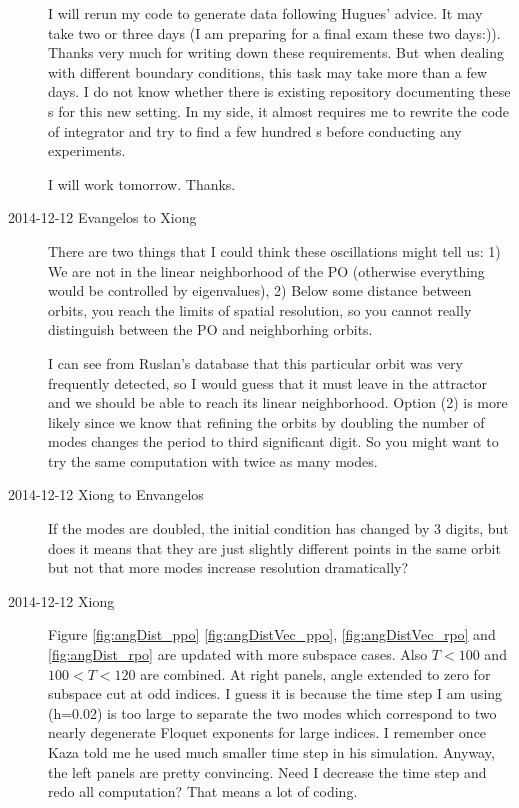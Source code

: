 \begin{description}
I will rerun my code to generate data following Hugues' advice.
It may take two or three days (I am preparing for a final exam these
two days:)). Thanks very much for writing down these requirements.
But when dealing with different boundary conditions,
this task may take more than a few days.
I do not know whether there is existing repository
documenting these \po s for this new setting.
In my side, it almost requires me to rewrite
the code of integrator and try to find a few hundred \po s
before conducting any experiments.

I will work tomorrow. Thanks.

\item[2014-12-12 Evangelos to Xiong] There are two things that I could think
these oscillations might tell us: 1) We are not in the linear
neighborhood of the PO (otherwise everything would be controlled by
{\stabmat} eigenvalues), 2) Below some distance between orbits, you reach
the limits of spatial resolution, so you cannot really distinguish
between the PO and neighborhing orbits.

I can see from Ruslan's database that this particular orbit was very
frequently detected, so I would guess that it must leave in the attractor
and we should be able to reach its linear neighborhood. Option (2) is more
likely since we know that refining the orbits by doubling the number of
modes changes the period to third significant digit. So you might want to
try the same computation with twice as many modes.

\item[2014-12-12 Xiong to Envangelos]
  If the modes are doubled, the initial condition has changed by 3 digits,
  but does it means that they are just slightly
  different points in the same orbit but not that more modes increase
  resolution dramatically?

\item[2014-12-12 Xiong]
  Figure \ref{fig:angDist_ppo} \ref{fig:angDistVec_ppo},
  \ref{fig:angDistVec_rpo} and \ref{fig:angDist_rpo} are updated with
  more subspace cases. Also $T<100$ and $100<T<120$ are combined.
  At right panels, angle extended to zero for subspace cut at
  odd indices. I guess it is because the time step I am using (h=0.02) is
  too large to separate the two modes which correspond to two nearly
  degenerate Floquet exponents for large indices.
  I remember once Kaza told me he used much
  smaller time step in his simulation. Anyway, the left panels are
  pretty convincing. Need I decrease the time step and
  redo all computation? That means a lot of coding.


\end{description}
